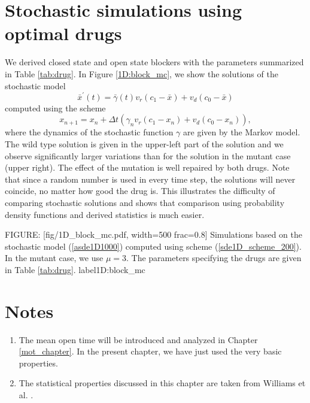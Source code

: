 {\section[Stochastic simulations]{Stochastic simulations using optimal drugs}
\label{ffgg100}

We derived closed state and open state blockers with the parameters summarized in Table \ref{tab:drug}. 
In Figure \ref{1D:block_mc}, we show the solutions of the stochastic model 
\begin{equation}
\bar{x}^{\prime}(t)=\bar{\gamma}(t)v_{r}(c_{1}-\bar{x})+v_{d}(c_{0}-\bar{x})
\label{asde1D1000}
\end{equation}
 computed 
using the scheme 
\begin{equation}
x_{n+1}=x_{n}+\Delta t\left( \gamma_{n}v_{r}(c_{1}-x_{n})+v_{d}(c_{0}
-x_{n})\right) \label{sde1D_scheme_200},
\end{equation}
where
 the dynamics of the stochastic function $\gamma$ are given by the Markov model. 
 The wild type solution is given in the upper-left part of the solution and we observe significantly larger 
 variations than for the solution in the mutant case (upper right). 
 The effect of the mutation is well repaired by both drugs. 
 Note that since a random number is used in every time step, the solutions will never coincide, no matter how good the drug is. This illustrates the difficulty of comparing stochastic solutions and shows that comparison using probability density functions and derived statistics is much easier.


FIGURE: [fig/1D_block_mc.pdf, width=500 frac=0.8] Simulations based on the stochastic model (\ref{asde1D1000}) computed 
using scheme (\ref{sde1D_scheme_200}). 
In the mutant case, we use $\mu=3$. The parameters specifying the drugs
are given in Table \ref{tab:drug}. 
 label{1D:block_mc}%


\section{Notes}

\begin{enumerate}
\item The mean open time will be introduced and analyzed in Chapter \ref{mot_chapter}. In the present chapter, we have just used the very basic properties.
\item The statistical properties discussed in this chapter are taken from Williams et al. \cite{Williams2008}.
\end{enumerate}

}
